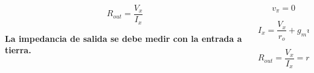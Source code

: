 \begin{frame}[t]
\begin{columns}
\begin{column}{0.5\textwidth}
            \[ R_{out} = \dfrac{V_x}{I_x} \]

            \vspace{3mm}
            \begin{center}
                \textbf{La impedancia de salida se debe medir con la entrada a tierra.}
            \end{center}
        \end{column}
        \begin{column}{0.5\textwidth}
            \[ v_\pi = 0 \]

            \[ I_x = \dfrac{V_x}{r_o} + g_m v_\pi \]
    
            \[ \boxed{R_{out} = \dfrac{V_x}{I_x} = r_o} \]
        \end{column}
    \end{columns}
\end{frame}


